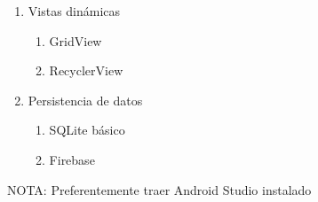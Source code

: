 \documentclass[11pt]{mylib/documentoProteco}
\begin{document}
\begin{multicols*}{2}
\begin{enumerate}
  \item Vistas dinámicas
  \begin{enumerate}
    \item GridView
    \item RecyclerView
  \end{enumerate}

  \item Persistencia de datos
  \begin{enumerate}
    \item SQLite básico
    \item Firebase
  \end{enumerate}

\end{enumerate}

\columnbreak
\noindent
NOTA: Preferentemente traer Android Studio instalado

\end{multicols*}
\end{document}

